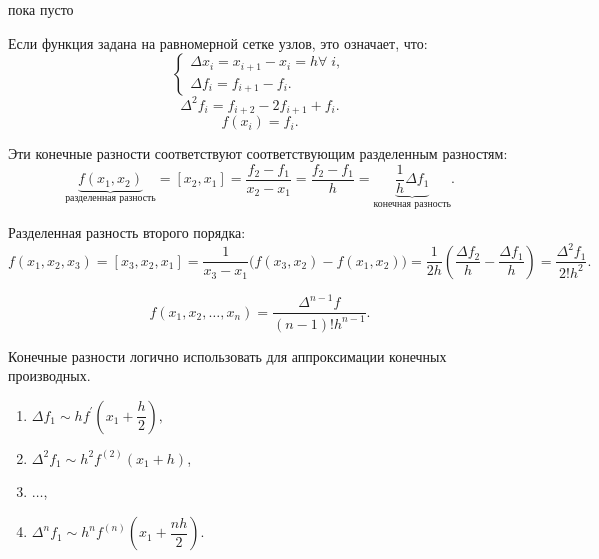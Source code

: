 \begin{col-answer-preambule}
	\begin{plan}
    \item пока пусто
	\end{plan}
\end{col-answer-preambule}


Если функция задана на равномерной сетке узлов, это означает, что:
\begin{equation*}
  \begin{cases}
    \Delta x_i = x_{i + 1} - x_i = h \forall \; i, \\
    \Delta f_i = f_{i+1} - f_i.
  \end{cases}
\end{equation*}
\begin{equation*}
  \Delta^2 f_i = f_{i+2} - 2 f_{i+1} + f_i.
\end{equation*}
\begin{equation*}
  f(x_i) = f_i.
\end{equation*}

Эти конечные разности соответствуют соответствующим разделенным разностям:
\begin{equation*}
  \underbrace{f(x_1, x_2)}_{\text{разделенная разность}} = [x_2, x_1] = \dfrac{f_2 - f_1}{x_2 - x_1} = \dfrac{f_2 - f_1}{h} = \underbrace{\dfrac{1}{h} \Delta f_1}_{\text{конечная разность}}.
\end{equation*}

Разделенная разность второго порядка:
\begin{equation*}
  f(x_1, x_2, x_3) = [x_3, x_2, x_1] = \dfrac{1}{x_3 - x_1} \Big( f(x_3, x_2) - f(x_1, x_2) \Big) = \dfrac{1}{2h} \left(\dfrac{\Delta f_2}{h} - \dfrac{\Delta f_1}{h} \right) = \dfrac{\Delta^2 f_1}{2! h^2}.
\end{equation*}

\begin{equation*}
  f(x_1, x_2, \ldots, x_n) = \dfrac{\Delta^{n-1} f}{(n-1)! h^{n-1}}.
\end{equation*}

Конечные разности логично использовать для аппроксимации конечных производных.

\begin{enumerate}
  \item $\Delta f_1 \sim h f^{'} \left(x_1 + \dfrac{h}{2} \right),$
  \item $\Delta^2 f_1 \sim h^2 f^{(2)} (x_1 + h)$,
  \item $\ldots$,
  \item $\Delta^n f_1 \sim h^n f^{(n)} (x_1 + \dfrac{n h}{2}).$
\end{enumerate}

